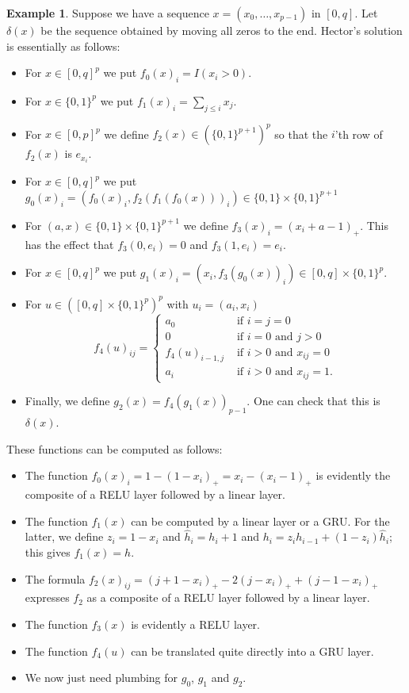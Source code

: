 \documentclass{amsart}
\newcommand{\dl}        {\delta}
\newcommand{\tm}        {\times}
\renewcommand{\:}{\colon}
\theoremstyle{definition}
\newtheorem{example}[theorem]{Example}
\begin{document}
\begin{example}
 Suppose we have a sequence $x=(x_0,\dotsc,x_{p-1})$ in $[0,q]$.  Let
 $\dl(x)$ be the sequence obtained by moving all zeros to the end.
 Hector's solution is essentially as follows:
 \begin{itemize}
  \item For $x\in[0,q]^p$ we put $f_0(x)_i=I(x_i>0)$.
  \item For $x\in\{0,1\}^p$ we put $f_1(x)_i=\sum_{j\leq i}x_j$.
  \item For $x\in[0,p]^p$ we define $f_2(x)\in (\{0,1\}^{p+1})^p$ so that
   the $i$'th row of $f_2(x)$ is $e_{x_i}$.
  \item For $x\in[0,q]^p$ we put
   $g_0(x)_i=(f_0(x)_i, f_2(f_1(f_0(x)))_i)\in\{0,1\}\tm\{0,1\}^{p+1}$
  \item For $(a,x)\in\{0,1\}\tm\{0,1\}^{p+1}$ we define
   $f_3(x)_i=(x_i+a-1)_+$.  This has the effect that $f_3(0,e_i)=0$
   and $f_3(1,e_i)=e_i$.  
  \item For $x\in[0,q]^p$ we put
   $g_1(x)_i=(x_i,f_3(g_0(x))_i)\in[0,q]\tm\{0,1\}^p$.
  \item For $u\in([0,q]\tm\{0,1\}^p)^p$ with $u_i=(a_i,x_i)$ 
   \[ f_4(u)_{ij}= \begin{cases}
       a_0 & \text{ if } i=j=0 \\
       0   & \text{ if } i=0 \text{ and } j>0 \\
       f_4(u)_{i-1,j} & \text{ if } i>0 \text{ and } x_{ij}=0 \\
       a_i & \text{ if } i>0 \text{ and } x_{ij} =1. 
      \end{cases}
   \]
  \item Finally, we define $g_2(x)=f_4(g_1(x))_{p-1}$.  One can check
   that this is $\dl(x)$.
 \end{itemize}
 These functions can be computed as follows:
 \begin{itemize}
  \item The function $f_0(x)_i=1-(1-x_i)_+=x_i-(x_i-1)_+$ is evidently
   the composite of a RELU layer followed by a linear layer.
  \item The function $f_1(x)$ can be computed by a linear layer or a
   GRU.  For the latter, we define $z_i=1-x_i$ and
   $\widehat{h}_i=h_i+1$ and $h_i=z_ih_{i-1}+(1-z_i)\widehat{h}_i$;
   this gives $f_1(x)=h$.
  \item The formula $f_2(x)_{ij}=(j+1-x_i)_+-2(j-x_i)_++(j-1-x_i)_+$
   expresses $f_2$ as a composite of a RELU layer followed by a linear
   layer. 
  \item The function $f_3(x)$ is evidently a RELU layer.
  \item The function $f_4(u)$ can be translated quite directly into a
   GRU layer.
  \item We now just need plumbing for $g_0$, $g_1$ and $g_2$.
 \end{itemize}
\end{example}
\end{document}

